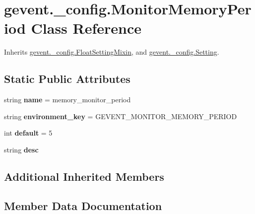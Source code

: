 \hypertarget{classgevent_1_1__config_1_1_monitor_memory_period}{}\section{gevent.\+\_\+config.\+Monitor\+Memory\+Period Class Reference}
\label{classgevent_1_1__config_1_1_monitor_memory_period}


Inherits \hyperlink{classgevent_1_1__config_1_1_float_setting_mixin}{gevent.\+\_\+config.\+Float\+Setting\+Mixin}, and \hyperlink{classgevent_1_1__config_1_1_setting}{gevent.\+\_\+config.\+Setting}.

\subsection*{Static Public Attributes}
\begin{DoxyCompactItemize}
\item 
\mbox{\label{classgevent_1_1__config_1_1_monitor_memory_period_a8571a0ca87474c9141c474d860769a23}} 
string {\bfseries name} = \textquotesingle{}memory\+\_\+monitor\+\_\+period\textquotesingle{}
\item 
\mbox{\label{classgevent_1_1__config_1_1_monitor_memory_period_a278d8b728445a100d90de24b0759d6d7}} 
string {\bfseries environment\+\_\+key} = \textquotesingle{}G\+E\+V\+E\+N\+T\+\_\+\+M\+O\+N\+I\+T\+O\+R\+\_\+\+M\+E\+M\+O\+R\+Y\+\_\+\+P\+E\+R\+I\+OD\textquotesingle{}
\item 
\mbox{\label{classgevent_1_1__config_1_1_monitor_memory_period_a22e87ba3700b04d10eca83657be38b70}} 
int {\bfseries default} = 5
\item 
string {\bfseries desc}
\end{DoxyCompactItemize}
\subsection*{Additional Inherited Members}


\subsection{Member Data Documentation}
\mbox{\label{classgevent_1_1__config_1_1_monitor_memory_period_a0407388ea43f2b20c6a31c2383a0e83e}} 

